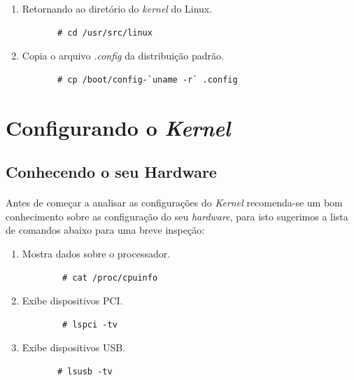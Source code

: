 \documentclass[a4paper,10pt]{article}
\begin{document}
\begin{enumerate}
	\item Retornando ao diretório do \emph{kernel} do Linux.
	  \begin{lstlisting}
	   # cd /usr/src/linux 
	  \end{lstlisting}

	\item Copia o arquivo \emph{.config} da distribuição padrão.
	  \begin{lstlisting}
	   # cp /boot/config-`uname -r` .config
	  \end{lstlisting}

  \end{enumerate}
\newpage
\section{Configurando o \emph{Kernel}}
  \subsection{Conhecendo o seu Hardware}
    \paragraph{}
    Antes de começar a analisar as configurações do \emph{Kernel} recomenda-se um bom conhecimento sobre as configuração do 
    seu \emph{hardware}, para isto sugerimos a lista de comandos abaixo para uma breve inspeção:
      \begin{enumerate}
	\item Mostra dados sobre o processador.
	  \begin{lstlisting}
	    # cat /proc/cpuinfo 
	  \end{lstlisting}	     
	\item Exibe dispositivos PCI.
	  \begin{lstlisting}
	    # lspci -tv	
	  \end{lstlisting}

	\item Exibe dispositivos USB.
	  \begin{lstlisting}
	   # lsusb -tv 
	  \end{lstlisting}
      \end{enumerate}
\end{document}

